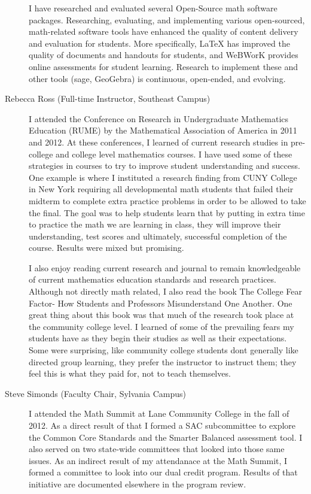 \begin{description}
	I have researched and evaluated several Open-Source math software packages.
	Researching, evaluating, and implementing various open-sourced, math-related
	software tools have enhanced the quality of content delivery and evaluation for
	students. More specifically, LaTeX has improved the quality of documents and
	handouts for students, and WeBWorK provides online assessments for student
	learning. Research to implement these and other tools (sage, GeoGebra) is
	continuous, open-ended, and evolving.

	\item[Rebecca Ross (Full-time Instructor, Southeast Campus)]
	I attended the Conference on Research in Undergraduate Mathematics Education
	(RUME) by the Mathematical Association of America in 2011 and 2012.  At these
	conferences, I learned of current research studies in pre-college and college
	level mathematics courses.  I have used some of these strategies in courses to
	try to improve student understanding and success.  One example is where I
	instituted a research finding from CUNY College in New York requiring all
	developmental math students that failed their midterm to complete extra
	practice problems in order to be allowed to take the final.  The goal was to
	help students learn that by putting in extra time to practice the math we are
	learning in class, they will improve their understanding, test scores and
	ultimately, successful completion of the course.  Results were mixed but
	promising.

	I also enjoy reading current research and journal to remain knowledgeable of
	current mathematics education standards and research practices.  Although not
	directly math related, I also read the book The College Fear Factor- How
	Students and Professors Misunderstand One Another.  One great thing about this
	book was that much of the research took place at the community college level.  I learned of some of the prevailing fears my students have as they begin their studies as well as their expectations.  Some were surprising, like community college students dont generally like directed group learning, they prefer the instructor to instruct them; they feel this is what they paid for, not to teach themselves.

	\item[Steve Simonds (Faculty Chair, Sylvania Campus)]
	I attended the Math Summit at Lane Community College in the fall of 2012.  As a
	direct result of that I formed a SAC subcommittee to explore the Common Core
	Standards and the Smarter Balanced assessment tool.  I also served on two
	state-wide committees that looked into those same issues.  As an indirect
	result of my attendanace at the Math Summit, I formed a committee to look into
	our dual credit program.  Results of that initiative are documented elsewhere
	in the program review.


\end{description}
